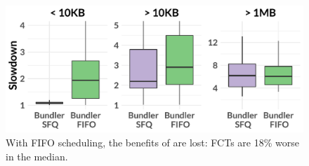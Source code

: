 \begin{figure}
    \centering
\begin{knitrout}
\color{fgcolor}
\includegraphics[width=\maxwidth]{figure/eval:fifo-1} 

\end{knitrout}
    \caption{With FIFO scheduling, the benefits of \name are lost: FCTs are 18\% worse in the median.}
    \label{fig:eval:fifo}
\end{figure}
\newcommand{\overviewBenefitsFifoMedian}{1.96\xspace}
\newcommand{\overviewBenefitsFifoWorse}{18\%\xspace}
